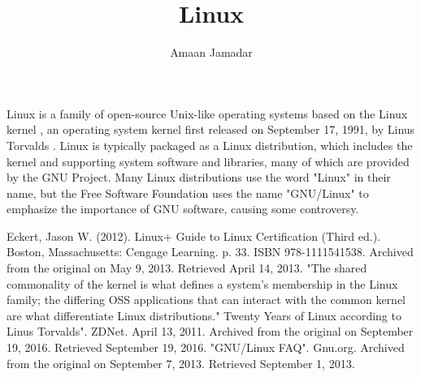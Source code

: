 \documentclass[a4paper,10pt]{article}
\title{Linux}
\author{Amaan Jamadar}
\begin{document}
\maketitle

Linux is a family of open-source Unix-like operating systems based on the Linux kernel \cite{kernel}, an operating system kernel first released on September 17, 1991, by Linus Torvalds \cite{linus}. Linux is typically packaged as a Linux distribution, which includes the kernel and supporting system software and libraries, many of which are provided by the GNU Project. Many Linux distributions use the word "Linux" in their name, but the Free Software Foundation uses the name "GNU/Linux" to emphasize the importance of GNU software, causing some controversy. \cite{gnu}

\medskip

\begin{thebibliography}{}
Eckert, Jason W. (2012). Linux+ Guide to Linux Certification (Third ed.). Boston, Massachusetts: Cengage Learning. p. 33. ISBN 978-1111541538. Archived from the original on May 9, 2013. Retrieved April 14, 2013. "The shared commonality of the kernel is what defines a system's membership in the Linux family; the differing OSS applications that can interact with the common kernel are what differentiate Linux distributions."
Twenty Years of Linux according to Linus Torvalds". ZDNet. April 13, 2011. Archived from the original on September 19, 2016. Retrieved September 19, 2016.
 "GNU/Linux FAQ". Gnu.org. Archived from the original on September 7, 2013. Retrieved September 1, 2013.
\end{thebibliography}
\end{document}
